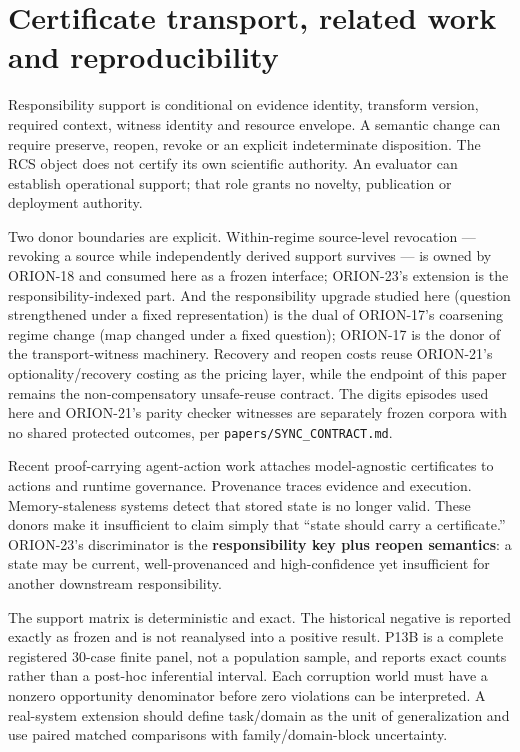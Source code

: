 \section{Certificate transport, related work and
reproducibility}\label{certificate-transport-related-work-and-reproducibility}

Responsibility support is conditional on evidence identity, transform
version, required context, witness identity and resource envelope. A
semantic change can require preserve, reopen, revoke or an explicit
indeterminate disposition. The RCS object does not certify its own
scientific authority. An evaluator can establish operational support;
that role grants no novelty, publication or deployment authority.

Two donor boundaries are explicit. Within-regime source-level revocation
--- revoking a source while independently derived support survives ---
is owned by ORION-18 and consumed here as a frozen interface; ORION-23's
extension is the responsibility-indexed part. And the responsibility
upgrade studied here (question strengthened under a fixed
representation) is the dual of ORION-17's coarsening regime change (map
changed under a fixed question); ORION-17 is the donor of the
transport-witness machinery. Recovery and reopen costs reuse ORION-21's
optionality/recovery costing as the pricing layer, while the endpoint of
this paper remains the non-compensatory unsafe-reuse contract. The
digits episodes used here and ORION-21's parity checker witnesses are
separately frozen corpora with no shared protected outcomes, per
\texttt{papers/SYNC\_CONTRACT.md}.

Recent proof-carrying agent-action work attaches model-agnostic
certificates to actions and runtime governance. Provenance traces
evidence and execution. Memory-staleness systems detect that stored
state is no longer valid. These donors make it insufficient to claim
simply that ``state should carry a certificate.'' ORION-23's
discriminator is the \textbf{responsibility key plus reopen semantics}:
a state may be current, well-provenanced and high-confidence yet
insufficient for another downstream responsibility.

The support matrix is deterministic and exact. The historical negative
is reported exactly as frozen and is not reanalysed into a positive
result. P13B is a complete registered 30-case finite panel, not a
population sample, and reports exact counts rather than a post-hoc
inferential interval. Each corruption world must have a nonzero
opportunity denominator before zero violations can be interpreted. A
real-system extension should define task/domain as the unit of
generalization and use paired matched comparisons with
family/domain-block uncertainty.
